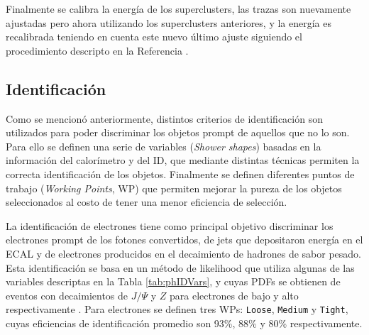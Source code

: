 Finalmente se calibra la energía de los superclusters, las trazas son nuevamente ajustadas pero ahora utilizando los superclusters anteriores, y la energía es recalibrada teniendo en cuenta este nuevo último ajuste siguiendo el procedimiento descripto en la Referencia \cite{PERF-2017-03}.


\subsection{Identificación}\label{sec:ph_id}

Como se mencionó anteriormente, distintos criterios de identificación son utilizados para poder discriminar los objetos prompt
de aquellos que no lo son. Para ello se definen una serie de variables (\textit{Shower shapes}) basadas en la información del calorímetro y del ID, que mediante distintas técnicas permiten la correcta identificación de los objetos. Finalmente se definen diferentes puntos de trabajo (\textit{Working Points}, WP) que permiten mejorar la pureza de los objetos seleccionados al costo de tener una menor eficiencia de selección.

La identificación de electrones tiene como principal objetivo discriminar los electrones prompt de los fotones convertidos, de jets que depositaron energía en el ECAL y de electrones producidos en el decaimiento de hadrones de sabor pesado. Esta identificación se basa en un método de likelihood que utiliza algunas de las variables descriptas en la Tabla \ref{tab:phIDVars}, y cuyas PDFs se obtienen de eventos con decaimientos de $J/\Psi$ \cite{tesis_fer} y $Z$ para electrones de bajo y alto \ET respectivamente \cite{PERF-2016-01}. Para electrones se definen tres WPs: \texttt{Loose}, \texttt{Medium} y \texttt{Tight}, cuyas eficiencias de identificación promedio son  93\%, 88\% y 80\% respectivamente.

